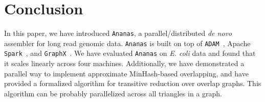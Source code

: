 \documentclass[11pt]{article}
\theoremstyle{plain}
\begin{document}
\section{Conclusion}
\label{sec:conclusion}

In this paper, we have introduced \texttt{Ananas}, a parallel/distributed \emph{de novo} assembler
for long read genomic data. \texttt{Ananas} is built on top of \texttt{ADAM}~\cite{massie13,
nothaft15}, Apache \texttt{Spark}~\cite{zaharia12, zaharia10}, and \texttt{GraphX}~\cite{gonzalez14,
xin13}. We have evaluated \texttt{Ananas} on \emph{E. coli} data and found that it scales linearly across
four machines. Additionally, we have demonstrated a parallel way to implement approximate MinHash-based
overlapping, and have provided a formalized algorithm for transitive reduction over overlap graphs.
This algorithm can be probably parallelized across all triangles in a graph.



\end{document}
